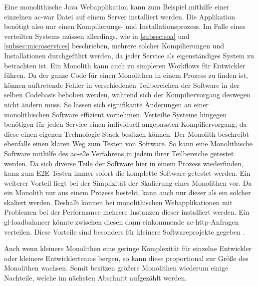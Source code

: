     Eine monolithische Java Webapplikation kann zum Beispiel mithilfe einer einzelnen \gls{ac-war} Datei auf einem Server installiert werden. Die Applikation benötigt also nur einen Kompilierungs- und Installationsprozess. Im Falle eines verteilten Systems müssen allerdings, wie in \autoref{subsec:soa} und \autoref{subsec:microservices} beschrieben, mehrere solcher Kompilierungen und Installationen durchgeführt werden, da jeder Service als eigenständiges System zu betrachten ist. Ein Monolith kann auch zu simpleren Workflows für Entwickler führen. Da der ganze Code für einen Monolithen in einem Prozess zu finden ist, können auftretende Fehler in verschiedenen Teilbereichen der Software in der selben Codebasis behoben werden, während sich der Kompiliervorgang deswegen nicht ändern muss. So lassen sich signifikante Änderungen an einer monolithischen Software effizient vornehmen. Verteilte Systeme hingegen benötigen für jeden Service einen individuell angepassten Kompiliervorgang, da diese einen eigenen Technologie-Stack besitzen können. Der Monolith beschreibt ebenfalls einen klaren Weg zum Testen von Software. So kann eine Monolithische Software mithilfe des \gls{ac-e2e} Verfahrens in jedem ihrer Teilbereiche getestet werden. Da sich diverse Teile der Software hier in einem Prozess wiederfinden, kann zum E2E Testen immer sofort die komplette Software getestet werden. Ein weiterer Vorteil liegt bei der Simplizität der Skalierung eines Monolithen vor. Da ein Monolith nur aus einem Prozess besteht, kann auch nur dieser als ein solcher skaliert werden. Deshalb können bei monolithischen Webapplikationen mit Problemen bei der Performance mehrere Instanzen dieser installiert werden. Ein \gls{gl-loadbalancer} könnte zwischen diesen dann einkommende \gls{ac-http}-Anfragen verteilen. Diese Vorteile sind besonders für kleinere Softwareprojekte gegeben \parencites{newman2019monolith}{richardson2018mspatterns}[S. 24]{namiot2014micro}.

    Auch wenn kleinere Monolithen eine geringe Komplexität für einzelne Entwickler oder kleinere Entwicklerteams bergen, so kann diese proportional zur Größe des Monolithen wachsen. Somit besitzen größere Monolithen wiederum einige Nachteile, welche im nächsten Abschnitt aufgezählt werden.

